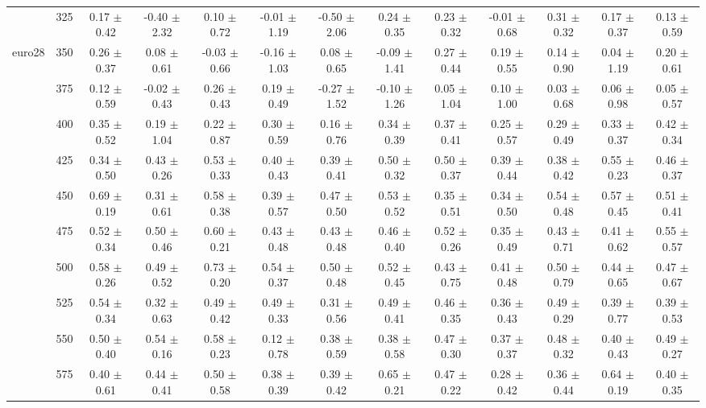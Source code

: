 \begin{table}[h]
{\begin{tabular}{
        ccccccccccccc}
 & 325& 0.17 $\pm$ 0.42& -0.40 $\pm$ 2.32& 0.10 $\pm$ 0.72& -0.01 $\pm$ 1.19& -0.50 $\pm$ 2.06& 0.24 $\pm$ 0.35& 0.23 $\pm$ 0.32& -0.01 $\pm$ 0.68& 0.31 $\pm$ 0.32& 0.17 $\pm$ 0.37& 0.13 $\pm$ 0.59 \\ 
\multirow{4}{*}{euro28}& 350& 0.26 $\pm$ 0.37& 0.08 $\pm$ 0.61& -0.03 $\pm$ 0.66& -0.16 $\pm$ 1.03& 0.08 $\pm$ 0.65& -0.09 $\pm$ 1.41& 0.27 $\pm$ 0.44& 0.19 $\pm$ 0.55& 0.14 $\pm$ 0.90& 0.04 $\pm$ 1.19& 0.20 $\pm$ 0.61 \\ 
 & 375& 0.12 $\pm$ 0.59& -0.02 $\pm$ 0.43& 0.26 $\pm$ 0.43& 0.19 $\pm$ 0.49& -0.27 $\pm$ 1.52& -0.10 $\pm$ 1.26& 0.05 $\pm$ 1.04& 0.10 $\pm$ 1.00& 0.03 $\pm$ 0.68& 0.06 $\pm$ 0.98& 0.05 $\pm$ 0.57 \\ 
 & 400& 0.35 $\pm$ 0.52& 0.19 $\pm$ 1.04& 0.22 $\pm$ 0.87& 0.30 $\pm$ 0.59& 0.16 $\pm$ 0.76& 0.34 $\pm$ 0.39& 0.37 $\pm$ 0.41& 0.25 $\pm$ 0.57& 0.29 $\pm$ 0.49& 0.33 $\pm$ 0.37& 0.42 $\pm$ 0.34 \\ 
 & 425& 0.34 $\pm$ 0.50& 0.43 $\pm$ 0.26& 0.53 $\pm$ 0.33& 0.40 $\pm$ 0.43& 0.39 $\pm$ 0.41& 0.50 $\pm$ 0.32& 0.50 $\pm$ 0.37& 0.39 $\pm$ 0.44& 0.38 $\pm$ 0.42& 0.55 $\pm$ 0.23& 0.46 $\pm$ 0.37 \\ 
 & 450& 0.69 $\pm$ 0.19& 0.31 $\pm$ 0.61& 0.58 $\pm$ 0.38& 0.39 $\pm$ 0.57& 0.47 $\pm$ 0.50& 0.53 $\pm$ 0.52& 0.35 $\pm$ 0.51& 0.34 $\pm$ 0.50& 0.54 $\pm$ 0.48& 0.57 $\pm$ 0.45& 0.51 $\pm$ 0.41 \\ 
 & 475& 0.52 $\pm$ 0.34& 0.50 $\pm$ 0.46& 0.60 $\pm$ 0.21& 0.43 $\pm$ 0.48& 0.43 $\pm$ 0.48& 0.46 $\pm$ 0.40& 0.52 $\pm$ 0.26& 0.35 $\pm$ 0.49& 0.43 $\pm$ 0.71& 0.41 $\pm$ 0.62& 0.55 $\pm$ 0.57 \\ 
 & 500& 0.58 $\pm$ 0.26& 0.49 $\pm$ 0.52& 0.73 $\pm$ 0.20& 0.54 $\pm$ 0.37& 0.50 $\pm$ 0.48& 0.52 $\pm$ 0.45& 0.43 $\pm$ 0.75& 0.41 $\pm$ 0.48& 0.50 $\pm$ 0.79& 0.44 $\pm$ 0.65& 0.47 $\pm$ 0.67 \\ 
 & 525& 0.54 $\pm$ 0.34& 0.32 $\pm$ 0.63& 0.49 $\pm$ 0.42& 0.49 $\pm$ 0.33& 0.31 $\pm$ 0.56& 0.49 $\pm$ 0.41& 0.46 $\pm$ 0.35& 0.36 $\pm$ 0.43& 0.49 $\pm$ 0.29& 0.39 $\pm$ 0.77& 0.39 $\pm$ 0.53 \\ 
 & 550& 0.50 $\pm$ 0.40& 0.54 $\pm$ 0.16& 0.58 $\pm$ 0.23& 0.12 $\pm$ 0.78& 0.38 $\pm$ 0.59& 0.38 $\pm$ 0.58& 0.47 $\pm$ 0.30& 0.37 $\pm$ 0.37& 0.48 $\pm$ 0.32& 0.40 $\pm$ 0.43& 0.49 $\pm$ 0.27 \\ 
 & 575& 0.40 $\pm$ 0.61& 0.44 $\pm$ 0.41& 0.50 $\pm$ 0.58& 0.38 $\pm$ 0.39& 0.39 $\pm$ 0.42& 0.65 $\pm$ 0.21& 0.47 $\pm$ 0.22& 0.28 $\pm$ 0.42& 0.36 $\pm$ 0.44& 0.64 $\pm$ 0.19& 0.40 $\pm$ 0.35 \\ 

\end{tabular}}
\end{table}
